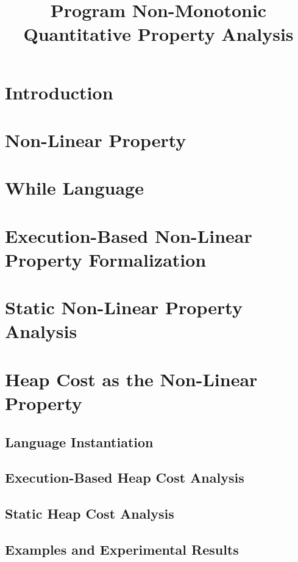 \documentclass[a4paper,11pt]{article}
\begin{document}
\title{Program Non-Monotonic Quantitative Property Analysis}

\author{}

\date{}

\maketitle
%
\tableofcontents

% 
\section{Introduction}
% 
\section{Non-Linear Property}

\section{{While Language}}
\label{sec:language}

\clearpage
\section{Execution-Based Non-Linear Property Formalization}
\label{sec:exe}
\clearpage
\section{Static Non-Linear Property Analysis}
\label{sec:static}
\section{Heap Cost as the Non-Linear Property}
\label{sec:app-heap}
\subsection{Language Instantiation}
\subsection{Execution-Based Heap Cost Analysis}
\subsection{Static Heap Cost Analysis}
\subsection{Examples and Experimental Results}


\end{document}
